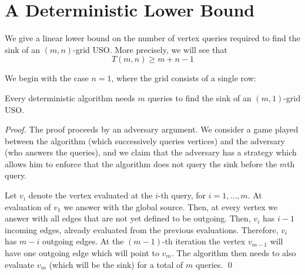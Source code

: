 \documentclass[runningheads,a4paper]{llncs}
\begin{document}
\section{A Deterministic Lower Bound}
\label{app:determlowerbound}

We give a linear lower bound on the number of vertex queries required to find
the sink of an $(m,n)$-grid USO.
More precisely, we will see that
\[
    T(m,n) \ge m + n -1
\]

We begin with the case $n=1$, where the grid consists of a single row:

\begin{lemma}\label{lem:kx1}
Every deterministic algorithm needs $m$ queries to find the sink of an $(m,1)$-grid USO.
\end{lemma}
\begin{proof}
    The proof proceeds by an adversary argument.
    We consider a game played between the algorithm (which successively
    queries vertices) and the adversary (who answers the queries),
    and we claim that the adversary has a strategy which allows him to enforce
    that the algorithm does not query the sink before the $m$th query.

Let $v_i$ denote the vertex evaluated at the $i$-th query, for $i=1,\ldots, m$. At evaluation of $v_1$ we answer with the global source. Then, at every vertex
we answer with all edges that are not yet defined to be outgoing. Then, $v_i$ has $i-1$ incoming edges, already evaluated from the previous evaluations. 
Therefore, $v_i$ has $m-i$ outgoing edges. At the $(m-1)$-th iteration the vertex $v_{m-1}$ will have one outgoing edge which will point to $v_m$.
The algorithm then needs to also evaluate $v_m$ (which will be the sink) for a total of $m$ queries. \qed 
\end{proof}
\end{document}
